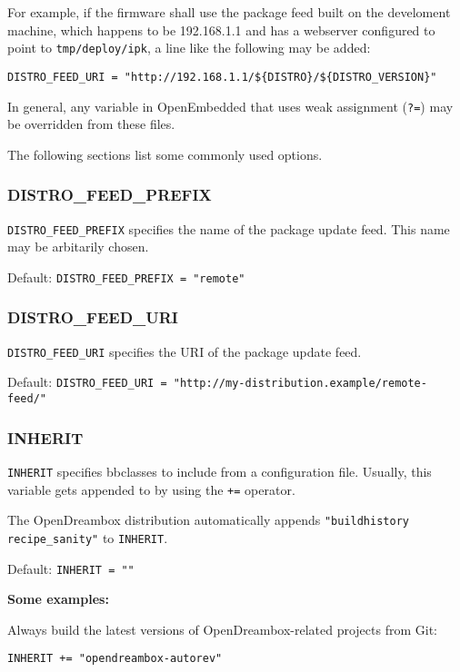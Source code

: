 \documentclass[a4paper]{article}
\newcommand{\shell}[1]{\texttt{\small #1}}
\begin{document}
     For example, if the firmware shall use the package feed built on the develoment machine, which
     happens to be 192.168.1.1 and has a webserver configured to point to \shell{tmp/deploy/ipk},
     a line like the following may be added:

     \shell{DISTRO\_FEED\_URI = "http://192.168.1.1/\$\{DISTRO\}/\$\{DISTRO\_VERSION\}"}

     In general, any variable in OpenEmbedded that uses weak assignment (\shell{?=}) may be
     overridden from these files.

     The following sections list some commonly used options.

     \subsubsection{DISTRO\_FEED\_PREFIX}

       \shell{DISTRO\_FEED\_PREFIX} specifies the name of the package update feed.
       This name may be arbitarily chosen.

       Default: \shell{DISTRO\_FEED\_PREFIX = "remote"}

     \subsubsection{DISTRO\_FEED\_URI}

       \shell{DISTRO\_FEED\_URI} specifies the URI of the package update feed.

       Default: \shell{DISTRO\_FEED\_URI = "http://my-distribution.example/remote-feed/"}

     \subsubsection{INHERIT}

       \shell{INHERIT} specifies bbclasses to include from a configuration file. Usually,
       this variable gets appended to by using the \shell{+=} operator.

       The OpenDreambox distribution automatically appends \shell{"buildhistory recipe\_sanity"} to \shell{INHERIT}.

       Default: \shell{INHERIT = ""}

       \textbf{Some examples:}

       Always build the latest versions of OpenDreambox-related projects from Git:

       \shell{INHERIT += "opendreambox-autorev"}
\end{document}
